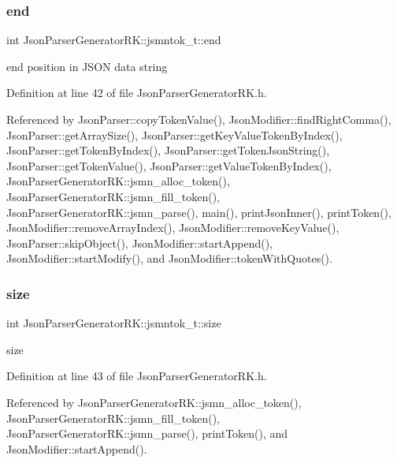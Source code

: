 \subsubsection{end}
{\footnotesize\ttfamily int Json\+Parser\+Generator\+R\+K\+::jsmntok\+\_\+t\+::end}



end position in J\+S\+ON data string 



Definition at line 42 of file Json\+Parser\+Generator\+R\+K.\+h.



Referenced by Json\+Parser\+::copy\+Token\+Value(), Json\+Modifier\+::find\+Right\+Comma(), Json\+Parser\+::get\+Array\+Size(), Json\+Parser\+::get\+Key\+Value\+Token\+By\+Index(), Json\+Parser\+::get\+Token\+By\+Index(), Json\+Parser\+::get\+Token\+Json\+String(), Json\+Parser\+::get\+Token\+Value(), Json\+Parser\+::get\+Value\+Token\+By\+Index(), Json\+Parser\+Generator\+R\+K\+::jsmn\+\_\+alloc\+\_\+token(), Json\+Parser\+Generator\+R\+K\+::jsmn\+\_\+fill\+\_\+token(), Json\+Parser\+Generator\+R\+K\+::jsmn\+\_\+parse(), main(), print\+Json\+Inner(), print\+Token(), Json\+Modifier\+::remove\+Array\+Index(), Json\+Modifier\+::remove\+Key\+Value(), Json\+Parser\+::skip\+Object(), Json\+Modifier\+::start\+Append(), Json\+Modifier\+::start\+Modify(), and Json\+Modifier\+::token\+With\+Quotes().

\mbox{\label{struct_json_parser_generator_r_k_1_1jsmntok__t_a4fe2f163e9a419ab974b88e95d9e6d9e}} 
\subsubsection{size}
{\footnotesize\ttfamily int Json\+Parser\+Generator\+R\+K\+::jsmntok\+\_\+t\+::size}



size 



Definition at line 43 of file Json\+Parser\+Generator\+R\+K.\+h.



Referenced by Json\+Parser\+Generator\+R\+K\+::jsmn\+\_\+alloc\+\_\+token(), Json\+Parser\+Generator\+R\+K\+::jsmn\+\_\+fill\+\_\+token(), Json\+Parser\+Generator\+R\+K\+::jsmn\+\_\+parse(), print\+Token(), and Json\+Modifier\+::start\+Append().

